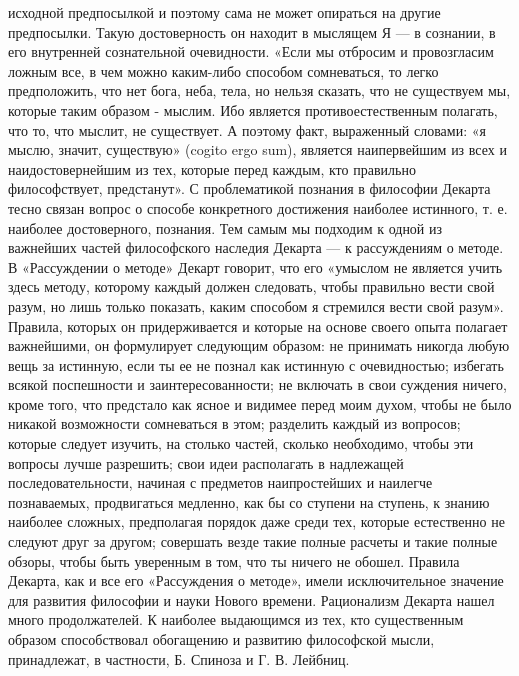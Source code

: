 \documentclass[12pt]{article}
\begin{document}
исходной предпосылкой и поэтому сама не может опираться на другие предпосылки. Такую достоверность он
находит в мыслящем Я — в сознании, в его внутренней сознательной очевидности. «Если мы отбросим и
провозгласим ложным все, в чем можно каким-либо способом сомневаться, то легко предположить, что нет
бога, неба, тела, но нельзя сказать, что не существуем мы, которые таким образом - мыслим. Ибо является
противоестественным полагать, что то, что мыслит, не существует. А поэтому факт, выраженный словами: «я
мыслю, значит, существую» (cogito ergo sum), является наипервейшим из всех и наидостовернейшим из тех,
которые перед каждым, кто правильно философствует, предстанут».
С  проблематикой  познания  в  философии  Декарта тесно  связан  вопрос  о  способе конкретного достижения
наиболее истинного, т. е. наиболее достоверного, познания. Тем самым мы подходим к одной из важнейших
частей философского наследия Декарта — к рассуждениям о методе.
В «Рассуждении о методе» Декарт говорит, что его «умыслом не является учить здесь методу, которому каждый
должен следовать, чтобы правильно вести свой разум, но лишь только показать, каким способом я стремился
вести свой разум».
Правила, которых он придерживается и которые на основе своего опыта полагает важнейшими, он формулирует
следующим образом:
не  принимать  никогда любую  вещь за  истинную, если ты ее не познал как истинную с очевидностью;
избегать всякой поспешности и заинтересованности; не включать в свои суждения ничего, кроме того, что
предстало как ясное и видимее перед моим духом, чтобы не было никакой возможности сомневаться в этом;
разделить каждый из вопросов; которые следует изучить, на столько частей, сколько необходимо, чтобы эти 
вопросы лучше разрешить;
свои идеи располагать в надлежащей последовательности,    начиная    с    предметов    наипростейших и
наилегче познаваемых, продвигаться медленно, как бы со ступени на ступень, к знанию наиболее
сложных, предполагая порядок даже среди тех, которые естественно не следуют друг за другом;
совершать везде такие полные расчеты и такие полные обзоры, чтобы быть уверенным в том, что ты ничего не
обошел.
Правила  Декарта,  как  и  все  его  «Рассуждения  о  методе»,  имели  исключительное  значение  для  развития
философии и науки Нового времени.
Рационализм Декарта нашел много продолжателей. К наиболее выдающимся из тех, кто существенным образом
способствовал обогащению и развитию философской мысли, принадлежат, в частности, Б. Спиноза и Г. В.
Лейбниц.
\end{document}
